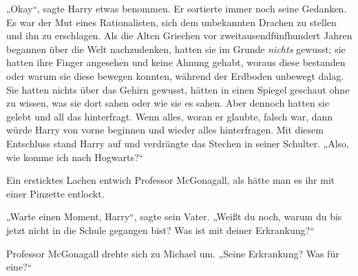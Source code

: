 „Okay“, sagte Harry etwas benommen. Er sortierte immer noch seine Gedanken. Es war der Mut eines Rationalisten, sich dem unbekannten Drachen zu stellen und ihn zu erschlagen. Als die Alten Griechen vor zweitausendfünfhundert Jahren begannen über die Welt nachzudenken, hatten sie im Grunde \emph{nichts} gewusst; sie hatten ihre Finger angesehen und keine Ahnung gehabt, woraus diese bestanden oder warum sie diese bewegen konnten, während der Erdboden unbewegt dalag. Sie hatten nichts über das Gehirn gewusst, hätten in einen Spiegel geschaut ohne zu wissen, was sie dort sahen oder wie sie es sahen. Aber dennoch hatten sie gelebt und all das hinterfragt. Wenn alles, woran er glaubte, falsch war, dann würde Harry von vorne beginnen und wieder alles hinterfragen.
Mit diesem Entschluss stand Harry auf und verdrängte das Stechen in seiner Schulter. „Also, wie komme ich nach Hogwarts?“

Ein ersticktes Lachen entwich Professor McGonagall, als hätte man es ihr mit einer Pinzette entlockt.

„Warte einen Moment, Harry“, sagte sein Vater. „Weißt du noch, warum du bis jetzt nicht in die Schule gegangen bist? Was ist mit deiner Erkrankung?“

Professor McGonagall drehte sich zu Michael um. „Seine Erkrankung? Was für eine?“

